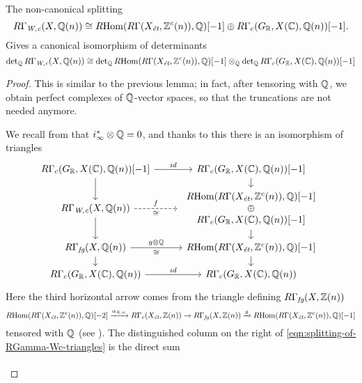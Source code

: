 \documentclass{article}
\numberwithin{equation}{section}
\begin{document}
\begin{lemma}
  The non-canonical splitting
  \[ R\Gamma_\Wc (X, \QQ(n)) \cong
    \RHom (R\Gamma (X_\et, \ZZ^c (n)), \QQ) [-1] \oplus
    R\Gamma_c (G_\RR, X (\CC), \QQ (n)) [-1]. \]
  Gives a canonical isomorphism of determinants
  \[ \det_\QQ R\Gamma_\Wc (X, \QQ(n)) \cong
    \det_\QQ \RHom (R\Gamma (X_\et, \ZZ^c (n)), \QQ) [-1] \otimes_\QQ
    \det_\QQ R\Gamma_c (G_\RR, X (\CC), \QQ (n)) [-1] \]

  \begin{proof}
    This is similar to the previous lemma; in fact, after tensoring with $\QQ$,
    we obtain perfect complexes of $\QQ$-vector spaces, so that the truncations
    are not needed anymore.

    We recall from \cite[Proposition~7.4]{Beshenov-Weil-etale-1} that
    $i_\infty^* \otimes \QQ = 0$, and thanks to this there is an isomorphism of
    triangles
    \begin{equation}
      \label{eqn:splitting-of-RGamma-Wc-triangles}
      \begin{tikzcd}[row sep=1em]
        R\Gamma_c (G_\RR, X (\CC), \QQ (n)) [-1] \ar{r}{id}\ar{d} & R\Gamma_c (G_\RR, X (\CC), \QQ (n)) [-1]\ar{d} \\
        R\Gamma_\Wc (X, \QQ(n)) \ar[dashed]{r}{f}[swap]{\cong}\ar{d} & \begin{array}{c} \RHom (R\Gamma (X_\et, \ZZ^c (n)), \QQ) [-1] \\ \oplus \\ R\Gamma_c (G_\RR, X (\CC), \QQ (n)) [-1] \end{array}\ar{d} \\
        R\Gamma_\fg (X, \QQ(n)) \ar{r}{g\otimes \QQ}[swap]{\cong}\ar{d} & \RHom (R\Gamma (X_\et, \ZZ^c (n)), \QQ) [-1] \ar{d} \\
        R\Gamma_c (G_\RR, X (\CC), \QQ (n)) \ar{r}{id} & R\Gamma_c (G_\RR, X (\CC), \QQ (n))
      \end{tikzcd}
    \end{equation}
    Here the third horizontal arrow comes from the triangle defining
    $R\Gamma_\fg (X, \ZZ(n))$
    \[ \RHom (R\Gamma (X_\et, \ZZ^c (n)), \QQ) [-2] \xrightarrow{\alpha_{X,n}}
      R\Gamma_c (X_\et, \ZZ (n)) \to
      R\Gamma_\fg (X, \ZZ(n)) \xrightarrow{g}
      \RHom (R\Gamma (X_\et, \ZZ^c (n)), \QQ) [-1] \]
    tensored with $\QQ$ (see \cite[\S 5]{Beshenov-Weil-etale-1}).
    The distinguished column on the right of
    \eqref{eqn:splitting-of-RGamma-Wc-triangles} is the direct sum
    \[ \begin{tikzcd}[row sep=1.5em]

\end{tikzcd}\]
\end{proof}
\end{lemma}
\end{document}
